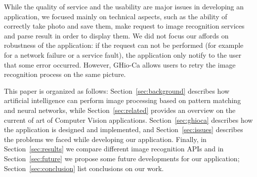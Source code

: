 While the quality of service and the usability are major issues in developing an application, we focused mainly on technical aspects, such as the ability of correctly take photo and save them, make request to image recognition services and parse result in order to display them. We did not focus our affords on robustness of the application: if the request can not be performed (for example for a network failure or a service fault), the application only notify to the user that some error occurred. However, GHio-Ca allows users to retry the image recognition process on the same picture.

This paper is organized as follows: Section~\ref{sec:background} describes how artificial intelligence can perform image processing based on pattern matching and neural networks, while Section~\ref{sec:related} provides an overview on the current of art of Computer Vision applications. Section~\ref{sec:ghioca} describes how the application is designed and implemented, and Section~\ref{sec:issues} describes the problems we faced while developing our application. Finally, in Section~\ref{sec:results} we compare different image recognition APIs and in Section~\ref{sec:future} we propose some future developments for our application; Section~\ref{sec:conclusion} list conclusions on our work.